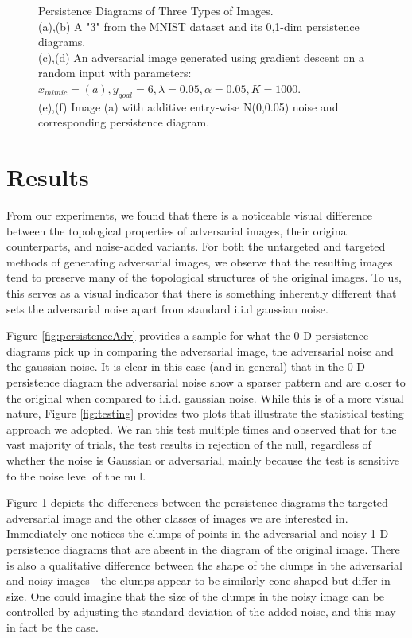 \documentclass[twoside,twocolumn]{article}
\begin{document}
\begin{figure}[!htb]
	\caption{Persistence Diagrams of Three Types of Images.\\
	(a),(b) A "3" from the MNIST dataset and its 0,1-dim persistence diagrams. \\
	(c),(d) An adversarial image generated using gradient descent on a random input with parameters:\\
	    \-\hspace{1em} $x_{mimic} = (a), y_{goal} = 6, \lambda = 0.05, \alpha = 0.05, K = 1000$. 
	\\
	(e),(f) Image (a) with additive entry-wise N(0,0.05) noise and corresponding persistence diagram.}
	\label{fig:targetedcomparison}
\end{figure}

\section{Results}

From our experiments, we found that there is a noticeable visual difference between the topological properties of adversarial images, their original counterparts, and noise-added variants. For both the untargeted and targeted methods of generating adversarial images, we observe that the resulting images tend to preserve many of the topological structures of the original images. To us, this serves as a visual indicator that there is something inherently different that sets the adversarial noise apart from standard i.i.d gaussian noise. 

Figure \ref{fig:persistenceAdv} provides a sample for what the 0-D persistence diagrams pick up in comparing the adversarial image, the adversarial noise and the gaussian noise. It is clear in this case (and in general) that in the 0-D persistence diagram the adversarial noise show a sparser pattern and are closer to the original when compared to i.i.d. gaussian noise.  While this is of a more visual nature, Figure \ref{fig:testing} provides two plots that illustrate the statistical testing approach we adopted.  We ran this test multiple times and observed that for the vast majority of trials, the test results in rejection of the null, regardless of whether the noise is Gaussian or adversarial, mainly because the test is sensitive to the noise level of the null.

Figure \ref{fig:targetedcomparison} depicts the differences between the persistence diagrams the targeted adversarial image and the other classes of images we are interested in. Immediately one notices the clumps of points in the adversarial and noisy 1-D persistence diagrams that are absent in the diagram of the original image. There is also a qualitative difference between the shape of the clumps in the adversarial and noisy images - the clumps appear to be similarly cone-shaped but differ in size. One could imagine that the size of the clumps in the noisy image can be controlled by adjusting the standard deviation of the added noise, and this may in fact be the case.
\end{document}
